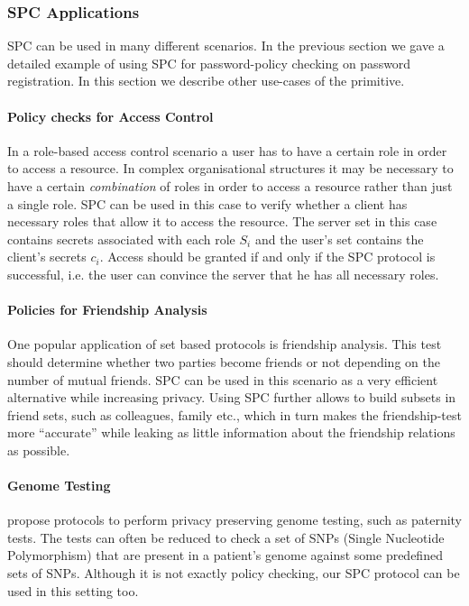 \subsubsection{SPC Applications}\label{sec:generalisation}
SPC can be used in many different scenarios.
In the previous section we gave a detailed example of using SPC for password-policy checking on password registration.
In this section we describe other use-cases of the primitive.

\paragraph{Policy checks for Access Control}
In a role-based access control scenario \cite{FerraioloK09} a user has to have a certain role in order to access a resource.
In complex organisational structures it may be necessary to have a certain \emph{combination} of roles in order to access a resource rather than just a single role.
SPC can be used in this case to verify whether a client has necessary roles that allow it to access the resource.
The server set \cS in this case contains secrets associated with each role $S_i$ and the user's set \cC contains the client's secrets $c_i$.
Access should be granted if and only if the SPC protocol is successful, i.e. the user can convince the server that he has all necessary roles.

\paragraph{Policies for Friendship Analysis}
One popular application of set based protocols is friendship analysis.
This test should determine whether two parties become friends or not depending on the number of mutual friends.
SPC can be used in this scenario as a very efficient alternative while increasing privacy.
Using SPC further allows to build subsets in friend sets, such as colleagues, family etc., which in turn makes the friendship-test more ``accurate'' while leaking as little information about the friendship relations as possible.

\paragraph{Genome Testing}
\citet{BaldiBCGT11} propose protocols to perform privacy preserving genome testing, such as paternity tests. 
The tests can often be reduced to check a set of SNPs (Single Nucleotide Polymorphism) that are present in a patient's genome against some predefined sets of SNPs. Although it is not exactly policy checking, our SPC protocol can be used in this setting too. 


